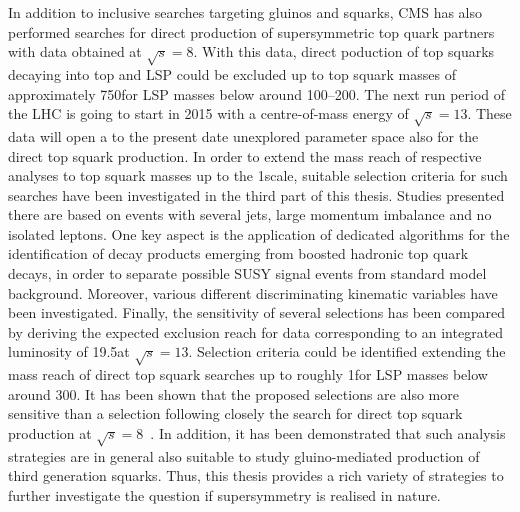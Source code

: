 In addition to inclusive searches targeting gluinos and squarks, CMS has also performed searches for direct production of supersymmetric top quark partners with data obtained at $\sqrt{s} = 8$\tev. With this data, direct poduction of top squarks decaying into top and LSP could be excluded up to top squark masses of approximately 750\gev for LSP masses below around 100--200\gev. The next run period of the LHC is going to start in 2015 with a centre-of-mass energy of $\sqrt{s} = 13$\tev. These data will open a to the present date unexplored parameter space also for the direct top squark production. In order to extend the mass reach of respective analyses to top squark masses up to the 1\tev scale, suitable selection criteria for such searches have been investigated in the third part of this thesis. Studies presented there are based on events with several jets, large momentum imbalance and no isolated leptons. One key aspect is the application of dedicated algorithms for the identification of decay products emerging from boosted hadronic top quark decays, in order to separate possible SUSY signal events from standard model background. Moreover, various different discriminating kinematic variables have been investigated. Finally, the sensitivity of several selections has been compared by deriving the expected exclusion reach for data corresponding to an integrated luminosity of 19.5\fbinv at $\sqrt{s} = 13$\tev. Selection criteria could be identified extending the mass reach of direct top squark searches up to roughly 1\tev for LSP masses below around 300\gev. It has been shown that the proposed selections are also more sensitive than a selection following closely the search for direct top squark production at $\sqrt{s} = 8$\tev~\cite{CMS-PAS-SUS-13-015}. In addition, it has been demonstrated that such analysis strategies are in general also suitable to study gluino-mediated production of third generation squarks. Thus, this thesis provides a rich variety of strategies to further investigate the question if supersymmetry is realised in nature. 


